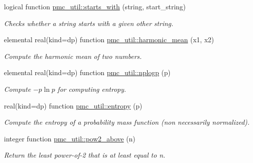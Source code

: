\begin{DoxyCompactItemize}
logical function \mbox{\hyperlink{namespacepmc__util_a397fa3e495a78638d8abfdb798d632f0}{pmc\+\_\+util\+::starts\+\_\+with}} (string, start\+\_\+string)
\begin{DoxyCompactList}\small\item\em Checks whether a string starts with a given other string. \end{DoxyCompactList}\item 
elemental real(kind=dp) function \mbox{\hyperlink{namespacepmc__util_ae5311f9f48ddfa5b7c24658526276621}{pmc\+\_\+util\+::harmonic\+\_\+mean}} (x1, x2)
\begin{DoxyCompactList}\small\item\em Compute the harmonic mean of two numbers. \end{DoxyCompactList}\item 
elemental real(kind=dp) function \mbox{\hyperlink{namespacepmc__util_a95ad9c9ce574477325505b3e913917cb}{pmc\+\_\+util\+::nplogp}} (p)
\begin{DoxyCompactList}\small\item\em Compute $ - p \ln p$ for computing entropy. \end{DoxyCompactList}\item 
real(kind=dp) function \mbox{\hyperlink{namespacepmc__util_af9bd7e3317d4574c2f4633e5f77df142}{pmc\+\_\+util\+::entropy}} (p)
\begin{DoxyCompactList}\small\item\em Compute the entropy of a probability mass function (non necessarily normalized). \end{DoxyCompactList}\item 
integer function \mbox{\hyperlink{namespacepmc__util_a1da5df278262d67cfd7576fedea5e9aa}{pmc\+\_\+util\+::pow2\+\_\+above}} (n)
\begin{DoxyCompactList}\small\item\em Return the least power-\/of-\/2 that is at least equal to n. \end{DoxyCompactList}\end{DoxyCompactItemize}
